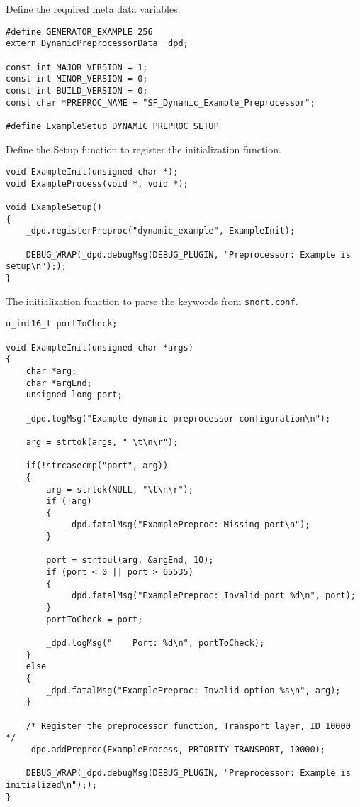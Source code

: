 \documentclass[english]{report}
\begin{document}
Define the required meta data variables.

\begin{verbatim}
#define GENERATOR_EXAMPLE 256
extern DynamicPreprocessorData _dpd;

const int MAJOR_VERSION = 1;
const int MINOR_VERSION = 0;
const int BUILD_VERSION = 0;
const char *PREPROC_NAME = "SF_Dynamic_Example_Preprocessor";

#define ExampleSetup DYNAMIC_PREPROC_SETUP
\end{verbatim}

Define the Setup function to register the initialization function.

\begin{verbatim}
void ExampleInit(unsigned char *);
void ExampleProcess(void *, void *);

void ExampleSetup()
{
    _dpd.registerPreproc("dynamic_example", ExampleInit);

    DEBUG_WRAP(_dpd.debugMsg(DEBUG_PLUGIN, "Preprocessor: Example is setup\n"););
}
\end{verbatim}

The initialization function to parse the keywords from \texttt{snort.conf}.

\begin{verbatim}
u_int16_t portToCheck;

void ExampleInit(unsigned char *args)
{
    char *arg;
    char *argEnd;
    unsigned long port;

    _dpd.logMsg("Example dynamic preprocessor configuration\n");

    arg = strtok(args, " \t\n\r");

    if(!strcasecmp("port", arg))
    {
        arg = strtok(NULL, "\t\n\r");
        if (!arg)
        {
            _dpd.fatalMsg("ExamplePreproc: Missing port\n");
        }
        
        port = strtoul(arg, &argEnd, 10);
        if (port < 0 || port > 65535)
        {
            _dpd.fatalMsg("ExamplePreproc: Invalid port %d\n", port);
        }
        portToCheck = port;
    
        _dpd.logMsg("    Port: %d\n", portToCheck);
    }
    else
    {
        _dpd.fatalMsg("ExamplePreproc: Invalid option %s\n", arg);
    }

    /* Register the preprocessor function, Transport layer, ID 10000 */
    _dpd.addPreproc(ExampleProcess, PRIORITY_TRANSPORT, 10000);

    DEBUG_WRAP(_dpd.debugMsg(DEBUG_PLUGIN, "Preprocessor: Example is initialized\n"););
}
\end{verbatim}
\end{document}
